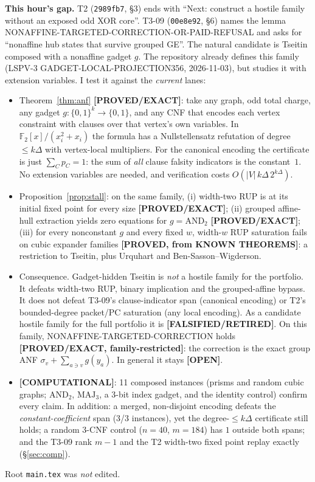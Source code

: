 \documentclass[11pt]{article}
\theoremstyle{definition}
\theoremstyle{remark}
\newcommand{\lab}[1]{\textbf{[#1]}}
\newcommand{\F}{\mathbb{F}}
\begin{document}
\textbf{This hour's gap.} T2 (\texttt{2989fb7}, \S3) ends with ``Next: construct a hostile
family without an exposed odd XOR core''. T3-09 (\texttt{00e8e92}, \S6) names the lemma
NONAFFINE-TARGETED-CORRECTION-OR-PAID-REFUSAL and asks for ``nonaffine hub states that survive
grouped GE''. The natural candidate is Tseitin composed with a nonaffine gadget $g$. The
repository already defines this family (LSPV-3 GADGET-LOCAL-PROJECTION356, 2026-11-03), but
studies it with extension variables. I test it against the \emph{current} lanes:
\begin{itemize}
\item Theorem~\ref{thm:anf} \lab{PROVED/EXACT}: take any graph, odd total charge, any gadget
$g:\{0,1\}^k\to\{0,1\}$, and any CNF that encodes each vertex constraint with clauses over that
vertex's own variables. In $\F_2[x]/(x_i^2+x_i)$ the formula has a Nullstellensatz refutation
of degree $\le k\Delta$ with vertex-local multipliers. For the canonical encoding the
certificate is just $\sum_{C}p_C=1$: the sum of \emph{all} clause falsity indicators is the
constant~$1$. No extension variables are needed, and verification costs
$O(|V|\,k\Delta\,2^{k\Delta})$.
\item Proposition~\ref{prop:stall}: on the same family, (i) width-two RUP is at its initial
fixed point for every size \lab{PROVED/EXACT}; (ii) grouped affine-hull extraction yields zero
equations for $g=\mathrm{AND}_2$ \lab{PROVED/EXACT}; (iii) for every nonconstant $g$ and every
fixed $w$, width-$w$ RUP saturation fails on cubic expander families \lab{PROVED, from KNOWN
THEOREMS}: a restriction to Tseitin, plus Urquhart and Ben-Sasson--Wigderson.
\item Consequence. Gadget-hidden Tseitin is \emph{not} a hostile family for the portfolio. It
defeats width-two RUP, binary implication and the grouped-affine bypass. It does not defeat
T3-09's clause-indicator span (canonical encoding) or T2's bounded-degree packet/PC saturation
(any local encoding). As a candidate hostile family for the full portfolio it is
\lab{FALSIFIED/RETIRED}. On this family, NONAFFINE-TARGETED-CORRECTION holds
\lab{PROVED/EXACT, family-restricted}: the correction is the exact group ANF
$\sigma_v+\sum_{a\ni v}g(y_a)$. In general it stays \lab{OPEN}.
\item \lab{COMPUTATIONAL}: 11 composed instances (prisms and random cubic graphs; $\mathrm{AND}_2$,
$\mathrm{MAJ}_3$, a 3-bit index gadget, and the identity control) confirm every claim. In
addition: a merged, non-disjoint encoding defeats the \emph{constant-coefficient} span (3/3
instances), yet the degree-$\le k\Delta$ certificate still holds; a random 3-CNF control
($n=40$, $m=184$) has $1$ outside both spans; and the T3-09 rank $m-1$ and the T2 width-two
fixed point replay exactly (\S\ref{sec:comp}).
\end{itemize}
Root \texttt{main.tex} was \emph{not} edited.
\end{document}
